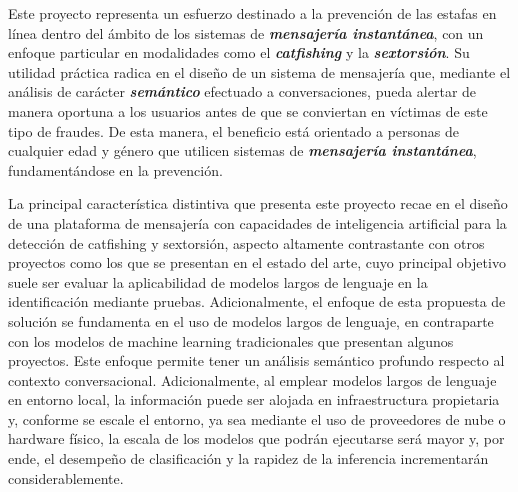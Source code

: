 Este proyecto representa un esfuerzo destinado a la prevención de las estafas en línea dentro del ámbito de los sistemas de \textbf{\textit{mensajería instantánea}}, con un enfoque particular en modalidades como el \textbf{\textit{catfishing}} y la \textbf{\textit{sextorsión}}. Su utilidad práctica radica en el diseño de un sistema de mensajería que, mediante el análisis de carácter \textbf{\textit{semántico}} efectuado a conversaciones, pueda alertar de manera oportuna a los usuarios antes de que se conviertan en víctimas de este tipo de fraudes. De esta manera, el beneficio está orientado a personas de cualquier edad y género que utilicen sistemas de \textbf{\textit{mensajería instantánea}}, fundamentándose en la prevención.

La principal característica distintiva que presenta este proyecto recae en el diseño de una plataforma de mensajería con capacidades de inteligencia artificial para la detección de catfishing y sextorsión, aspecto altamente contrastante con otros proyectos como los que se presentan en el estado del arte, cuyo principal objetivo suele ser evaluar la aplicabilidad de modelos largos de lenguaje en la identificación mediante pruebas. Adicionalmente, el enfoque de esta propuesta de solución se fundamenta en el uso de modelos largos de lenguaje, en contraparte con los modelos de machine learning tradicionales que presentan algunos proyectos. Este enfoque permite tener un análisis semántico profundo respecto al contexto conversacional. Adicionalmente, al emplear modelos largos de lenguaje en entorno local, la información puede ser alojada en infraestructura propietaria y, conforme se escale el entorno, ya sea mediante el uso de proveedores de nube o hardware físico, la escala de los modelos que podrán ejecutarse será mayor y, por ende, el desempeño de clasificación y la rapidez de la inferencia incrementarán considerablemente.




